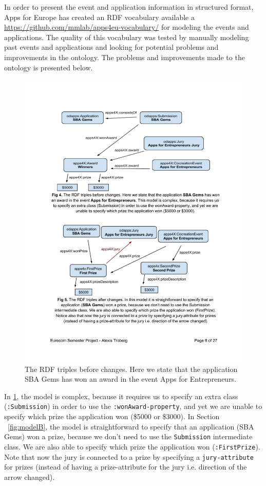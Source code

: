 In order to present the event and application information in structured format, Apps for Europe has created an RDF vocabulary available a \url{https://github.com/mmlab/apps4eu-vocabulary/} for modeling the events and applications. The quality of this vocabulary was tested by manually modeling past events  and applications and looking for potential problems and improvements in the ontology. The problems and improvements made to the ontology is presented below.

\begin{figure}[!htbp]

\includegraphics[scale=.8]{img/rdfTriplesBeforeChanges.pdf}
\caption{The RDF triples before changes. Here we state that the application SBA Gems has won an award in the event Apps for Entrepreneurs. }
\label{fig:modelA}
\end{figure}

In \ref{fig:modelA}, the model is complex, because it requires us to specify an extra class (\texttt{:Submission}) in order to use the \texttt{:wonAward-property}, and yet we are unable to specify which prize the application won (\$5000 or \$3000). In Section ~\ref{fig:modelB}, the model is straightforward to specify that an application (SBA Gems) won a prize, because we don't need to use the \texttt{Submission} intermediate class. We are also able to specify which prize the application won (\texttt{:FirstPrize}). Note that now the jury is connected to a prize by specifying a \texttt{jury-attribute} for prizes (instead of having a prize-attribute for the jury i.e. direction of the arrow changed).

